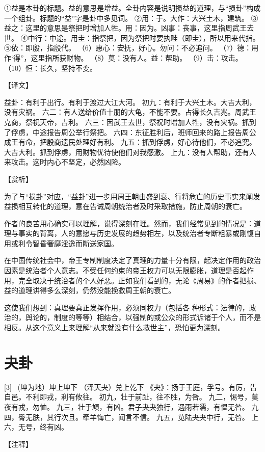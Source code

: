 \documentclass[12pt,UTF8]{ctexbook}
\begin{document}
①益是本卦的标题。益的意思是增益。全卦内容是说明损益的道理，与“损卦”构成一个组卦。标题的“益”字是卦中多见词。
②用：于。大作：大兴土木，建筑。
③益之：这里的意思是祭把时增加人牲。用：因为。凶事：丧事，这里指周武王去世。
④中行：中途。用圭：指祭把，因为祭把时要执畦（即圭），所以用来代指。
⑤依：即殷，指殷代。
（6）惠心：安抚，好心。勿问：不必追问。
（7）德：用作‘得”，这里指所获财物。
（8）莫：没有人。益：帮助。
（9）击：攻击。
（10）恒：长久，坚持不变。

【译文】

益卦：有利于出行。有利于渡过大江大河。
初九：有利于大兴土木。大吉大利，没有灾祸。
六二：有人送给价值十朋的大龟，不能不要。占得长久吉兆。周武王克商，祭祝天帝，吉利。
六三：因武王去世，祭祝时增加人牲，没有灾祸。抓到了俘虏，中途报告周公举行祭把。
六四：东征胜利后，班师回来的路上报告周公成王有命，把殷商遗民处理好有利。
九五：抓到俘虏，好心待他们，不必追究。大吉大利。抓到俘虏，用财物优待使他们对我感激。
上九：没有人帮助，还有人来攻击。这时内心不坚定，必然凶险。

【赏析】

为了与“损卦”对应，“益卦”进一步用周王朝由盛到衰、行将危亡的历史事实来阐发益损相互转化的道理，意在告诫周朝统治者及时采取措施，防止周朝的衰亡。

作者的良苦用心确实可以理解，说得深刻在理。然而，我们经常见到的情况是：道理与事实的背离，人的意愿与历史发展的趋势相左，以及统治者专断粗暴或刚愎自用或利令智昏奢靡淫逸而断送家国。

在中国传统社会中，帝王专制制度决定了真理的力量十分有限，起决定作用的政治因素是统治者个人意志。不受任何约束的帝王权力可以无限膨胀，道理是否起作用，完全取决于统治者的个人好恶。正如我们看到的，无论《周易》的作者把损、益的道理讲得多么深刻，仍然没能挽救周王朝的衰亡。

这使我们想到：真理要真正发挥作用，必须同权力（包括各 种形式：法律的，政治的，舆论的，制度的等等）相结合，以强制的或公众的形式诉诸于个人，而不是相反。从这个意义上来理解“从来就没有什么救世主”，恐怕更为深刻。

\chapter{夬卦}
[3] \ (坤为地）坤上坤下
（泽天夬）兑上乾下
《夬》：扬于王庭，孚号。有厉，告自邑。不利即戎，利有攸往。
初九，壮于前趾，往不胜，为咎。
九二，惕号，莫夜有戎，勿恤。
九三，壮于頄，有凶。君子夬夬独行，遇雨若濡，有愠无咎。
九四，臀无肤，其行次且。牵羊悔亡，闻言不信。
九五，苋陆夬夬中行，无咎。
上六，无号，终有凶。

【注释】
\end{document}

